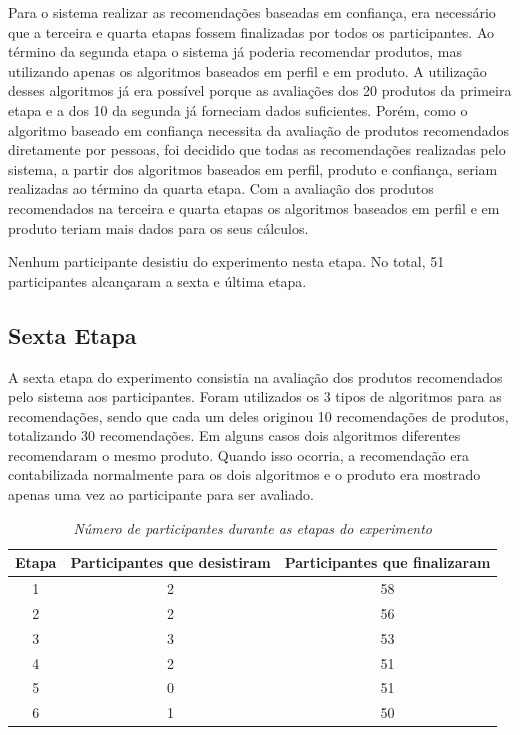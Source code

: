 Para o sistema realizar as recomendações baseadas em confiança, era necessário que a terceira e quarta etapas fossem finalizadas por todos os participantes. Ao término da segunda etapa o sistema já poderia recomendar produtos, mas utilizando apenas os algoritmos baseados em perfil e em produto. A utilização desses algoritmos já era possível porque as avaliações dos 20 produtos da primeira etapa e a dos 10 da segunda já forneciam dados suficientes. Porém, como o algoritmo baseado em confiança necessita da avaliação de produtos recomendados diretamente por pessoas, foi decidido que todas as recomendações realizadas pelo sistema, a partir dos algoritmos baseados em perfil, produto e confiança, seriam realizadas ao término da quarta etapa. Com a avaliação dos produtos recomendados na terceira e quarta etapas os algoritmos baseados em perfil e em produto teriam mais dados para os seus cálculos.

Nenhum participante desistiu do experimento nesta etapa. No total, 51 participantes alcançaram a sexta e última etapa.

\subsection{Sexta Etapa}

A sexta etapa do experimento consistia na avaliação dos produtos recomendados pelo sistema aos participantes. Foram utilizados os 3 tipos de algoritmos para as recomendações, sendo que cada um deles originou 10 recomendações de produtos, totalizando 30 recomendações. Em alguns casos dois algoritmos diferentes recomendaram o mesmo produto. Quando isso ocorria, a recomendação era contabilizada normalmente para os dois algoritmos e o produto era mostrado apenas uma vez ao participante para ser avaliado.

\begin{table}
\centering
\begin{tabular}{c c c}
	\hline \hline
	\textbf{Etapa}	&	\textbf{Participantes que desistiram}	&	\textbf{Participantes que finalizaram}	\\
	\hline
	1	&	2	&	58	\\
	\hline
	2	&	2	&	56	\\
	\hline
	3	&	3	&	53	\\
	\hline
	4	&	2	&	51	\\
	\hline
	5	&	0	&	51	\\
	\hline
	6	&	1	&	50	\\
	\hline
\end{tabular}
\caption{\it Número de participantes durante as etapas do experimento}
\label{table:participantes}
\end{table}

